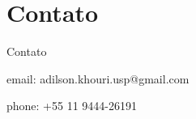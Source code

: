 \section{Contato}

\begin{frame}	
	\begin{block}{Contato}	
		\item email: adilson.khouri.usp@gmail.com
		\item phone: +55 11 9444-26191
	\end{block}
\end{frame}
